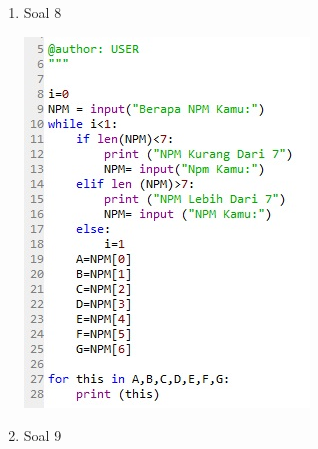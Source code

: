 \documentclass[a4paper,12pt]{report}
\begin{document}
\begin{enumerate}
\begin{center}
    \end{center}
    \item Soal 8
    \begin{center}
    \includegraphics[width=11cm\textwidth]{Figure/8.jpg}
    \end{center}
    \item Soal 9
    \begin{center}

\end{center}
\end{enumerate}
\end{document}

